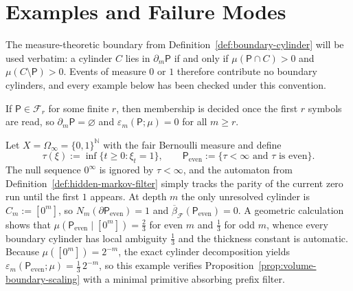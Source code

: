 \section{Examples and Failure Modes}
\label{sec:examples}

The measure-theoretic boundary from Definition~\ref{def:boundary-cylinder} will
be used verbatim: a cylinder $C$ lies in $\partial_m\mathsf{P}$ if and only if
$\mu(\mathsf{P}\cap C)>0$ and $\mu(C\setminus\mathsf{P})>0$.  Events of measure
$0$ or $1$ therefore contribute no boundary cylinders, and every example below
has been checked under this convention.

\begin{example}
\label{ex:finite-horizon-event}
If $\mathsf{P}\in\mathcal{F}_r$ for some finite $r$, then membership is decided
once the first $r$ symbols are read, so $\partial_m\mathsf{P}=\varnothing$ and
$\varepsilon_m(\mathsf{P};\mu)=0$ for all $m\ge r$.
\end{example}

\begin{example}
\label{ex:first-hit-parity}
Let $X=\Omega_\infty=\{0,1\}^{\mathbb{N}}$ with the fair Bernoulli measure and
define
\[
\tau(\xi):=\inf\{t\ge 0:\xi_t=1\},
\qquad
\mathsf{P}_{\mathrm{even}}:=\{\tau<\infty\text{ and }\tau\text{ is even}\}.
\]
The null sequence $0^\infty$ is ignored by $\tau<\infty$, and the automaton from
Definition~\ref{def:hidden-markov-filter} simply tracks the parity of the
current zero run until the first $1$ appears.  At depth $m$ the only unresolved
cylinder is $C_m:=[0^m]$, so $N_m(\partial\mathsf{P}_{\mathrm{even}})=1$ and
$\overline{\beta}_{\mathcal{F}}(\mathsf{P}_{\mathrm{even}})=0$.  A geometric
calculation shows that
$\mu(\mathsf{P}_{\mathrm{even}}\mid[0^m])=\frac23$ for even $m$ and
$\frac13$ for odd $m$, whence every boundary cylinder has local ambiguity
$\frac13$ and the thickness constant is automatic.  Because
$\mu([0^m])=2^{-m}$, the exact cylinder decomposition yields
$\varepsilon_m(\mathsf{P}_{\mathrm{even}};\mu)=\frac13\,2^{-m}$, so this example
verifies Proposition~\ref{prop:volume-boundary-scaling} with a minimal
primitive absorbing prefix filter.
\end{example}

